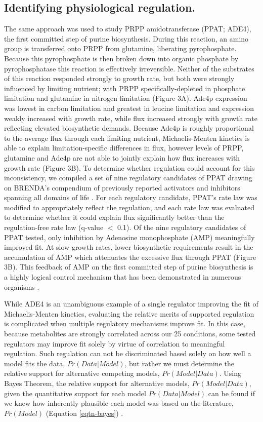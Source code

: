 \subsection{Identifying physiological regulation.}

The same approach was used to study PRPP amidotransferase (PPAT; ADE4), the first committed step of purine biosynthesis.  During this reaction, an amino group is transferred onto PRPP from glutamine, liberating pyrophosphate.  Because this pyrophosphate is then broken down into organic phosphate by pyrophosphatase this reaction is effectively irreversible.  Neither of the substrates of this reaction responded strongly to growth rate, but both were strongly influenced by limiting nutrient; with PRPP specifically-depleted in phosphate limitation and glutamine in nitrogen limitation (Figure 3A).  Ade4p expression was lowest in carbon limitation and greatest in leucine limitation and expression weakly increased with growth rate, while flux increased strongly with growth rate reflecting elevated biosynthetic demands. Because Ade4p is roughly proportional to the average flux through each limiting nutrient, Michaelis-Menten kinetics is able to explain limitation-specific differences in flux, however levels of PRPP, glutamine and Ade4p are not able to jointly explain how flux increases with growth rate (Figure 3B).  To determine whether regulation could account for this inconsistency, we compiled a set of nine regulatory candidates of PPAT drawing on BRENDA's compendium of previously reported activators and inhibitors spanning all domains of life \cite{Scheer:2011df}.  For each regulatory candidate, PPAT's rate law was modified to appropriately reflect the regulation, and each rate law was evaluated to determine whether it could explain flux significantly better than the regulation-free rate law (q-value $<$ 0.1).  Of the nine regulatory candidates of PPAT tested, only inhibition by Adenosine monophosphate (AMP) meaningfully improved fit. At slow growth rates, lower biosynthetic requirements result in the accumulation of AMP which attenuates the excessive flux through PPAT (Figure 3B).  This feedback of AMP on the first committed step of purine biosynthesis is a highly logical control mechanism that has been demonstrated in numerous organisms \cite{WYNGAARDEN:1959wf, Jones:1982dn}.

While ADE4 is an unambiguous example of a single regulator improving the fit of Michaelis-Menten kinetics, evaluating the relative merits of supported regulation is complicated when multiple regulatory mechanisms improve fit.  In this case, because metabolites are strongly correlated across our 25 conditions, some tested regulators may improve fit solely by virtue of correlation to meaningful regulation.  Such regulation can not be discriminated based solely on how well a model fits the data, $Pr(Data | Model)$, but rather we must determine the relative support for alternative competing models, $Pr(Model | Data)$.  Using Bayes Theorem, the relative support for alternative models, $Pr(Model | Data)$, given the quantitative support for each model $Pr(Data | Model)$ can be found if we knew how inherently plausible each model was based on the literature, $Pr(Model)$ (Equation \ref{eqtn-bayes}) \cite{Gelman:2003vk}.

